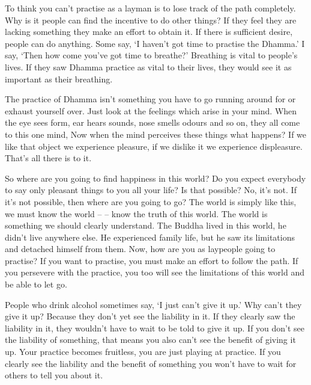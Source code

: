 To think you can't practise as a layman is to lose track of the path completely. Why is it people can find the incentive to do other things? If they feel they are lacking something they make an effort to obtain it. If there is sufficient desire, people can do anything. Some say, `I haven't got time to practise the Dhamma.' I say, `Then how come you've got time to breathe?' Breathing is vital to people's lives. If they saw Dhamma practice as vital to their lives, they would see it as important as their breathing.

The practice of Dhamma isn't something you have to go running around for or exhaust yourself over. Just look at the feelings which arise in your mind. When the eye sees form, ear hears sounds, nose smells odours and so on, they all come to this one mind,  Now when the mind perceives these things what happens? If we like that object we experience pleasure, if we dislike it we experience displeasure. That's all there is to it.

So where are you going to find happiness in this world? Do you expect everybody to say only pleasant things to you all your life? Is that possible? No, it's not. If it's not possible, then where are you going to go? The world is simply like this, we must know the world --  -- know the truth of this world. The world is something we should clearly understand. The Buddha lived in this world, he didn't live anywhere else. He experienced family life, but he saw its limitations and detached himself from them. Now, how are you as laypeople going to practise? If you want to practise, you must make an effort to follow the path. If you persevere with the practice, you too will see the limitations of this world and be able to let go.

People who drink alcohol sometimes say, `I just can't give it up.' Why can't they give it up? Because they don't yet see the liability in it. If they clearly saw the liability in it, they wouldn't have to wait to be told to give it up. If you don't see the liability of something, that means you also can't see the benefit of giving it up. Your practice becomes fruitless, you are just playing at practice. If you clearly see the liability and the benefit of something you won't have to wait for others to tell you about it.

